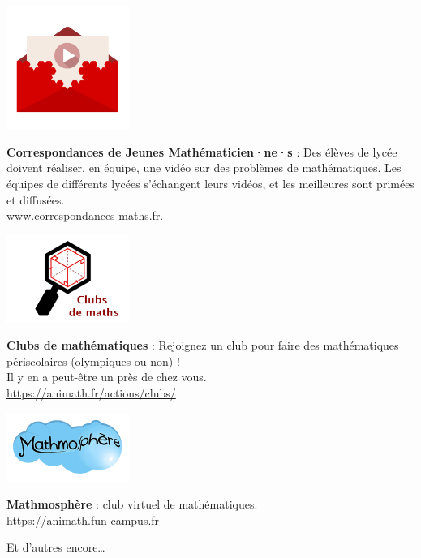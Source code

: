 \begin{minipage}[c]{.46\linewidth}
\includegraphics[width=40mm]{01-Intro/logos/correspondances.png}
\end{minipage}
\begin{minipage}[c]{.46\linewidth}
\textbf{Correspondances de Jeunes Mathématicien·ne·s} :
Des élèves de lycée doivent réaliser, en équipe, une vidéo sur des problèmes de mathématiques. Les équipes de différents lycées s'échangent leurs vidéos, et les meilleures sont primées et diffusées. \\
\url{www.correspondances-maths.fr}.
\end{minipage} \hfill


\vspace{4mm}



\begin{minipage}[c]{.46\linewidth}
\includegraphics[width=40mm]{01-Intro/logos/clubs_de_maths.png}
\end{minipage}
\begin{minipage}[c]{.46\linewidth}	
\textbf{Clubs de mathématiques} :
Rejoignez un club pour faire des mathématiques périscolaires (olympiques ou non) ! \\
Il y en a peut-être un près de chez vous. \\
\url{https://animath.fr/actions/clubs/}

\end{minipage} \hfill

		
	
\vspace{4mm}



\begin{minipage}[c]{.46\linewidth}
\includegraphics[width=40mm]{01-Intro/logos/mathmosphere.png}
\end{minipage}
\begin{minipage}[c]{.46\linewidth}	
\textbf{Mathmosphère} : club virtuel de mathématiques.
\\
\url{https://animath.fun-campus.fr}

\end{minipage} \hfill
\vspace{16mm}

Et d'autres encore…

\vfill
		
	
\pagebreak
